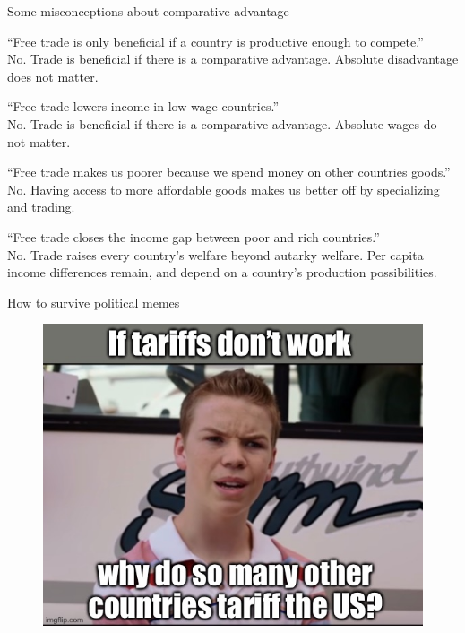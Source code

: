 \documentclass[notes,11pt, aspectratio=169, xcolor=table]{beamer}
\newenvironment{wideitemize}{\itemize\addtolength{\itemsep}{10pt}}{\enditemize}
\begin{document}
\begin{frame}{Some misconceptions about comparative advantage}
\begin{wideitemize}
    \item ``Free trade is only beneficial if a country is productive enough to compete.'' \\
    \qquad No. Trade is beneficial if there is a comparative advantage. Absolute disadvantage does not matter.

    \item<2-> ``Free trade lowers income in low-wage countries.'' \\
    \qquad No. Trade is beneficial if there is a comparative advantage. Absolute wages do not matter.

    \item<3-> ``Free trade makes us poorer because we spend money on other countries goods.'' \\
    \qquad No. Having access to more affordable goods makes us better off by specializing and trading.

    \item<4-> ``Free trade closes the income gap between poor and rich countries.'' \\
    \qquad No. Trade raises every country’s welfare beyond autarky welfare. Per capita
income differences remain, and depend on a country’s production possibilities.

\end{wideitemize}
    
\end{frame}



\begin{frame}{How to survive political memes}

\begin{figure}
    \centering
    \includegraphics[width=0.5\linewidth]{figs/meme2.jpg}
\end{figure}

    
\end{frame}
\end{document}
